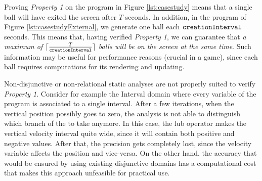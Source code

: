 Proving \emph{Property 1} on the program in Figure \ref{lst:casestudy} means that a single ball will have exited the screen after $T$ seconds. In addition, in the program of Figure \ref{lst:casestudyExternal}, we generate one ball each $\mathtt{creationInterval}$ seconds. This means that, having verified \emph{Property 1}, we can guarantee that \emph{a maximum of $\lceil \frac{T}{\mathtt{creationInterval}} \rceil$ balls will be on the screen at the same time}. Such information may be useful for performance reasons (crucial in a game), since each ball requires computations for its rendering and updating. 


Non-disjunctive or non-relational static analyses are not properly suited to verify \emph{Property 1}. Consider for example the Interval domain where every variable of the program is associated to a single interval. After a few iterations, when the vertical position possibly goes to zero, the analysis is not able to distinguish which branch of the  to take anymore. In this case, the lub operator makes the vertical velocity interval quite wide, since it will contain both positive and negative values. After that, the precision gets completely lost, since the velocity variable affects the position and vice-versa. On the other hand, the accuracy that would be ensured by using existing disjunctive domains has a computational cost that makes this approach unfeasible for practical use.

